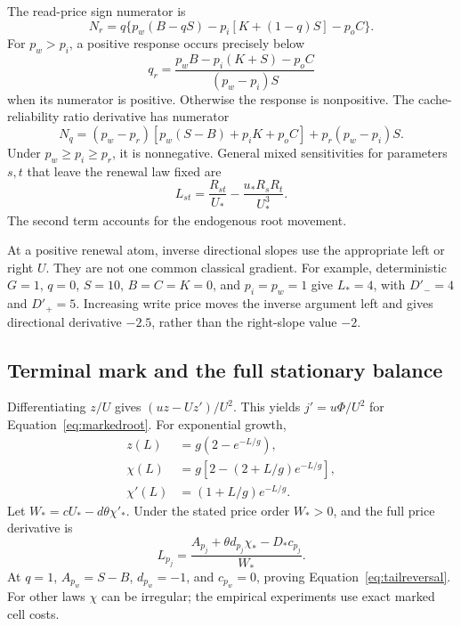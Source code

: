 \documentclass[sigconf,screen,nonacm]{acmart}
\begin{document}
The read-price sign numerator is
\begin{equation}
N_r=q\{p_w(B-qS)-p_i[K+(1-q)S]-p_oC\}.
\end{equation}
For $p_w>p_i$, a positive response occurs precisely below
\begin{equation}
q_r=\frac{p_wB-p_i(K+S)-p_oC}{(p_w-p_i)S}
\end{equation}
when its numerator is positive. Otherwise the response is nonpositive.
The cache-reliability ratio derivative has numerator
\begin{equation}
N_q=(p_w-p_r)[p_w(S-B)+p_iK+p_oC]+p_r(p_w-p_i)S.
\end{equation}
Under $p_w\ge p_i\ge p_r$, it is nonnegative. General mixed sensitivities
for parameters $s,t$ that leave the renewal law fixed are
\begin{equation}
L_{st}=\frac{R_{st}}{U_*}-\frac{u_*R_sR_t}{U_*^3}.
\end{equation}
The second term accounts for the endogenous root movement.

At a positive renewal atom, inverse directional slopes use the appropriate
left or right $U$. They are not one common classical gradient. For example,
deterministic $G=1$, $q=0$, $S=10$, $B=C=K=0$, and $p_i=p_w=1$ give
$L_*=4$, with $D'_-=4$ and $D'_+=5$. Increasing write price moves the
inverse argument left and gives directional derivative $-2.5$, rather than
the right-slope value $-2$.

\subsection{Terminal mark and the full stationary balance}
Differentiating $z/U$ gives $(uz-Uz')/U^2$. This yields
$j'=u\Phi/U^2$ for Equation~\eqref{eq:markedroot}. For exponential growth,
\begin{align}
z(L)&=g(2-e^{-L/g}),\\
\chi(L)&=g[2-(2+L/g)e^{-L/g}],\\
\chi'(L)&=(1+L/g)e^{-L/g}.
\end{align}
Let $W_* = cU_*-d\theta\chi'_*$. Under the stated price order $W_*>0$,
and the full price derivative is
\begin{equation}
L_{p_j}=\frac{A_{p_j}+\theta d_{p_j}\chi_*-D_*c_{p_j}}{W_*}.
\end{equation}
At $q=1$, $A_{p_w}=S-B$, $d_{p_w}=-1$, and $c_{p_w}=0$, proving
Equation~\eqref{eq:tailreversal}. For other laws $\chi$ can be irregular;
the empirical experiments use exact marked cell costs.
\end{document}
